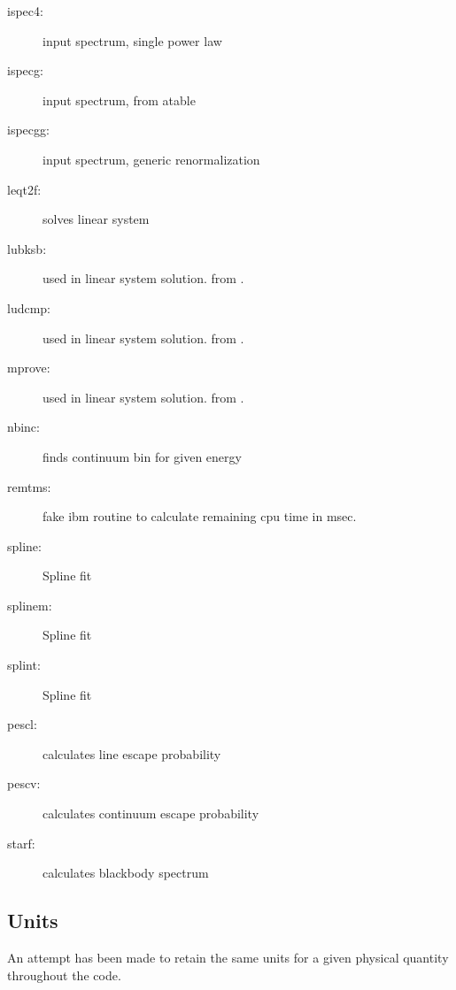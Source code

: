 \begin{description}
\item[ispec4:]input spectrum, single power law

\item[ispecg:]input spectrum, from atable

\item[ispecgg:]input spectrum, generic renormalization

\item[leqt2f:]solves linear system

\item[lubksb:]used in linear system solution.  from \cite{Press}.

\item[ludcmp:]used in linear system solution.  from \cite{Press}.

\item[mprove:]used in linear system solution.  from \cite{Press}.

\item[nbinc:] finds continuum bin for given energy

\item[remtms:]fake ibm routine to calculate remaining cpu time in msec.

\item[spline:] Spline fit

\item[splinem:] Spline fit

\item[splint:] Spline fit

\item[pescl:] calculates line escape probability

\item[pescv:] calculates continuum escape probability

\item[starf:]calculates blackbody spectrum


\end{description}


\subsection {Units}  

An attempt has been made to retain the same units for 
a given physical quantity throughout the code.

